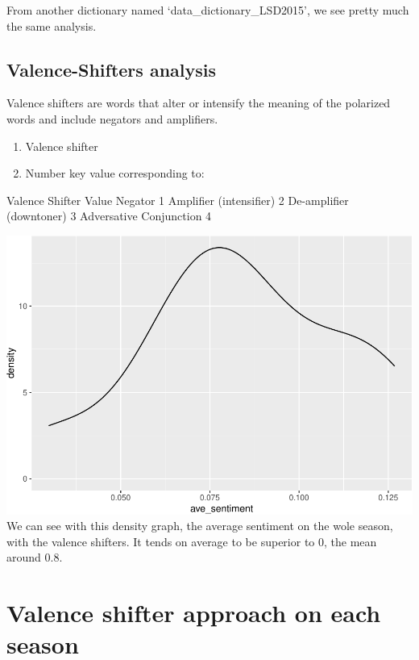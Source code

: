 \documentclass[
]{article}
\providecommand{\tightlist}{%
  \setlength{\itemsep}{0pt}\setlength{\parskip}{0pt}}
\begin{document}
From another dictionary named `data\_dictionary\_LSD2015', we see pretty
much the same analysis.

\hypertarget{valence-shifters-analysis}{%
\subsection{Valence-Shifters analysis}\label{valence-shifters-analysis}}

Valence shifters are words that alter or intensify the meaning of the
polarized words and include negators and amplifiers.

\begin{enumerate}
\def\labelenumi{\alph{enumi}.}
\setcounter{enumi}{23}
\tightlist
\item
  Valence shifter
\item
  Number key value corresponding to:
\end{enumerate}

Valence Shifter Value Negator 1 Amplifier (intensifier) 2 De-amplifier
(downtoner) 3 Adversative Conjunction 4

\includegraphics{report_files/figure-latex/unnamed-chunk-44-1.pdf} We
can see with this density graph, the average sentiment on the wole
season, with the valence shifters. It tends on average to be superior to
0, the mean around 0.8.

\hypertarget{valence-shifter-approach-on-each-season}{%
\section{Valence shifter approach on each
season}\label{valence-shifter-approach-on-each-season}}
\end{document}

